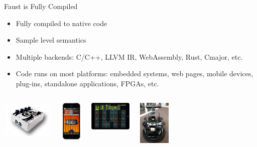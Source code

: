 
\begin{frame}[fragile]{Faust is Fully Compiled}
	\begin{itemize}

	\item Fully compiled to native code
        \item Sample level semantics
        \item Multiple backends: C/C++, LLVM IR, WebAssembly, Rust, Cmajor, etc.
        \item Code runs on most platforms: embedded systems, web pages, mobile devices, plug-ins, standalone applications, FPGAs, etc.

	\end{itemize}
    \begin{columns}
        \begin{center}
          \href{file:/Users/yannorlarey/Documents/demo-faust/0-Videos/1-faust-owl-android.mp4}{\includegraphics[width=2.5cm,keepaspectratio=true]{images/owl.jpg}}
        \end{center}

        \begin{center}
          \href{file:/Users/yannorlarey/Documents/demo-faust/0-Videos/5.1-MoForte-PowerChord.mp4}{\includegraphics[width=1cm,keepaspectratio=true]{images/moforte.png}}
        \end{center}

        \begin{center}
          \href{file:/Users/yannorlarey/Documents/demo-faust/0-Videos/5.2-Geo-Shred.mp4}{\includegraphics[width=2cm,keepaspectratio=true]{images/GeoShred}}
        \end{center}

        \begin{center}
            \href{file:/Users/yannorlarey/Documents/demo-faust/0-Videos/2-faust-ros.mp4}{\includegraphics[width=1.5cm,keepaspectratio=true]{images/emoxone}}
          \end{center}


\end{columns}
\end{frame}
